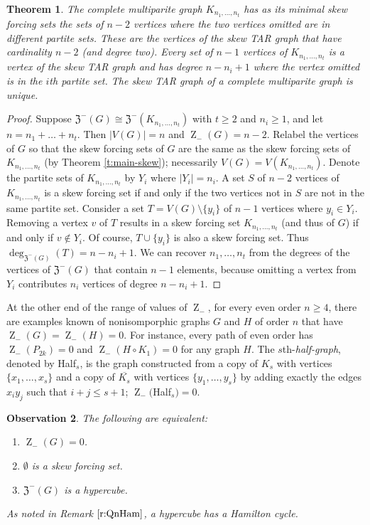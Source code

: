 \documentclass{article}
\numberwithin{figure}{section}
\numberwithin{table}{section}
\numberwithin{equation}{section}
\newtheorem{thm}{Theorem}[section]
\newtheorem{obs}[thm]{Observation}
\theoremstyle{definition}
\theoremstyle{definition}
\theoremstyle{definition}
\newcommand{\ben}{\begin{enumerate}}
\newcommand{\een}{\end{enumerate}}
\newcommand{\bpf}{\begin{proof}}
\newcommand{\epf}{\end{proof}\ms}
\newcommand{\ms}{\medskip}
\newcommand{\Zs}{\operatorname{Z}_-}
\newcommand{\zstar}{\mathfrak{Z}^-}%
\begin{document}
{\begin{thm}\label{t:skew-comp-multi}
 The  complete multiparite graph $K_{n_1,\dots,n_t}$ has as its minimal skew forcing sets the sets of $n-2$ vertices where the two vertices omitted are in  different partite sets.  These are the vertices of the skew TAR graph that have cardinality $n-2$ (and degree two).  Every set of $n-1$ vertices of $K_{n_1,\dots,n_t}$ is a vertex of the skew TAR graph and has degree $n-n_i+1$ where the vertex omitted is in the $i$th partite set.
The skew TAR graph of a complete multiparite graph is unique.
\end{thm}
\bpf Suppose $\zstar(G)\cong\zstar(K_{n_1,\dots,n_t})$ with $t\ge 2$ and $n_i\ge 1$, and let $n=n_1+\dots+n_t$.  Then $|V(G)|=n$ and $\Zs(G)=n-2$.
Relabel the vertices of $G$ so that the skew forcing sets of $G$ are the same as the skew forcing sets of $K_{n_1,\dots,n_t}$ (by Theorem \ref{t:main-skew}); necessarily $V(G)=V(K_{n_1,\dots,n_t})$. Denote the partite sets of $K_{n_1,\dots,n_t}$ by $Y_i$ where $|Y_i|=n_i$. A set $S$ of $n-2$ vertices of $K_{n_1,\dots,n_t}$ is a skew forcing set if and only if the two vertices not in $S$ are not in the same partite set.  Consider a set $T=V(G)\setminus\{y_i\}$ of $n-1$ vertices  
where  $y_i\in Y_i$.  %
Removing a vertex $v$ of $T$ results in a skew forcing set $K_{n_1,\dots,n_t}$ (and thus of $G$)  if and only if $v\not\in Y_i$.  Of course, $T\cup\{y_i\}$ is also a skew forcing set.  Thus  $\deg_{\zstar(G)}(T)=n-n_i+1$.  We can recover $n_1,\dots,n_t$ from the degrees of the  vertices of $\zstar(G)$ that contain $n-1$ elements, because omitting a vertex from $Y_i$ contributes $n_i$ vertices  of degree $n-n_i+1$.
\epf




At the other end of the range of values of $\Zs$, for every even order $n\ge 4$, there are examples known of nonisomporphic graphs $G$  and $H$ of order $n$ that have $\Zs(G) = \Zs(H)=0$. %
For instance,  every path of even order has $\Zs(P_{2k})=0$ and $\Zs(H\circ K_1)=0$ for any graph $H$.  The $s$th-\emph{half-graph}, denoted by Half$_s$, is the graph constructed from a copy of $K_s$ with vertices $\{x_1,\dots,x_s\}$ and a copy of $\overline{K_s}$ with vertices $\{y_1,\dots,y_s\}$ by adding exactly the edges $x_iy_j$ such that $i+j\leq s+1$; $\Zs($Half$_s)=0$. 

\begin{obs}
    The following are equivalent:
    \ben[$(1)$]
    \item $\Zs(G)=0$.
    \item $\emptyset$ is a skew forcing set.
    \item $\zstar(G)$ is a hypercube.
    \een
     As noted in Remark $\ref{r:QnHam}$, a hypercube has a Hamilton cycle.
\end{obs}

}
\end{document}
